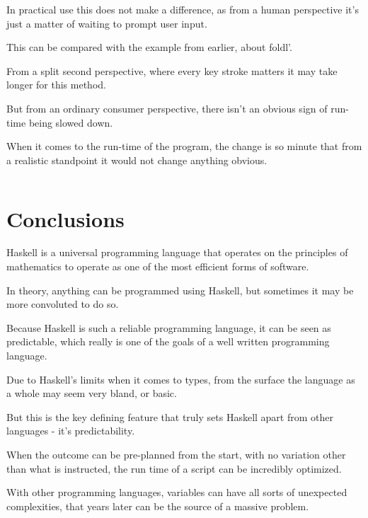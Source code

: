 \documentclass{article}
\begin{document}
\medskip\noindent
In practical use this does not make a difference, as from a human perspective it's just a matter of waiting to prompt user input. 

\medskip\noindent
This can be compared with the example from earlier, about foldl'.

\medskip\noindent
From a split second perspective, where every key stroke matters it may take longer for this method.

\medskip\noindent
But from an ordinary consumer perspective, there isn't an obvious sign of run-time being slowed down.

\medskip\noindent
When it comes to the run-time of the program, the change is so minute that from a realistic standpoint it would not change anything obvious.

\medskip\medskip
\begin{lstlisting}
\end{lstlisting}
\section{Conclusions}\label{conclusions}
\medskip\medskip
\hspace{\parindent} 

Haskell is a universal programming language that operates on the principles of mathematics to operate as one of the most efficient forms of software. 

\medskip\noindent
In theory, anything can be programmed using Haskell, but sometimes it may be more convoluted to do so. 

\medskip\noindent
Because Haskell is such a reliable programming language, it can be seen as predictable, which really is one of the goals of a well written programming language.

\medskip\noindent
Due to Haskell's limits when it comes to types, from the surface the language as a whole may seem very bland, or basic.

\medskip\noindent
But this is the key defining feature that truly sets Haskell apart from other languages - it's predictability. 

\medskip\noindent
When the outcome can be pre-planned from the start, with no variation other than what is instructed, the run time of a script can be incredibly optimized.

\medskip\noindent
With other programming languages, variables can have all sorts of unexpected complexities, that years later can be the source of a massive problem.
\end{document}
